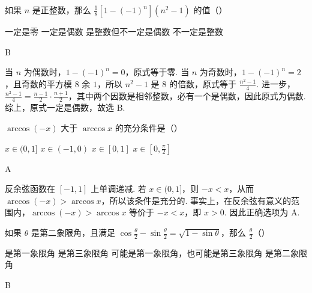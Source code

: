 \documentclass[UTF8,a4paper,oneside,11pt]{ctexbook}
\begin{document}
\begin{problem}

如果 \(n\) 是正整数，那么 \(\frac{1}{8}[1 - (-1)^n](n^2 - 1)\) 的值（\quad）

\choices
    {一定是零}
    {一定是偶数}
    {是整数但不一定是偶数}
    {不一定是整数}
\end{problem}

\begin{answer}
B
\end{answer}

\begin{solution}
当 \(n\) 为偶数时，\(1-(-1)^n=0\)，原式等于零. 当 \(n\) 为奇数时，\(1-(-1)^n=2\)，且奇数的平方模 \(8\) 余 \(1\)，所以 \(n^2-1\) 是 \(8\) 的倍数，原式等于 \(\frac{n^2-1}{4}\). 进一步，\(\frac{n^2-1}{4}=\frac{n-1}{2}\cdot\frac{n+1}{2}\)，其中两个因数是相邻整数，必有一个是偶数，因此原式为偶数. 综上，原式一定是偶数，故选 B.
\end{solution}

\begin{problem}

\(\arccos (-x)\) 大于 \(\arccos x\) 的充分条件是（\quad）

\choices
    {\(x \in (0,1]\)}
    {\(x \in (-1,0)\)}
    {\(x \in [0,1]\)}
    {\(x \in \left[0, \frac{\pi}{2}\right]\)}
\end{problem}

\begin{answer}
A
\end{answer}

\begin{solution}
反余弦函数在 \([-1,1]\) 上单调递减. 若 \(x\in(0,1]\)，则 \(-x<x\)，从而 \(\arccos(-x)>\arccos x\)，所以该条件是充分的. 事实上，在反余弦有意义的范围内，\(\arccos(-x)>\arccos x\) 等价于 \(-x<x\)，即 \(x>0\). 因此正确选项为 A.
\end{solution}

\begin{problem}

如果 \(\theta\) 是第二象限角，且满足 \(\cos \frac{\theta}{2} - \sin \frac{\theta}{2} = \sqrt{1 - \sin \theta}\)，那么 \(\frac{\theta}{2}\)（\quad）

\choices
    {是第一象限角}
    {是第三象限角}
    {可能是第一象限角，也可能是第三象限角}
    {是第二象限角}
\end{problem}

\begin{answer}
B
\end{answer}
\end{document}
